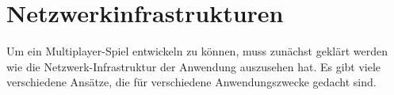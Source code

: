 



\section{Netzwerkinfrastrukturen}\label{sec:basics-network-structures}
Um ein Multiplayer-Spiel entwickeln zu können, muss zunächst geklärt werden wie die Netzwerk-Infrastruktur der Anwendung auszusehen hat. Es gibt viele verschiedene Ansätze, die für verschiedene Anwendungszwecke gedacht sind.

